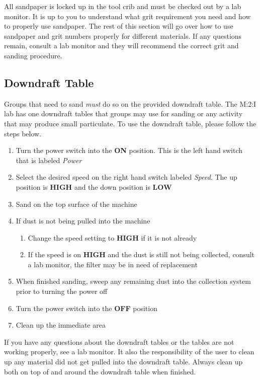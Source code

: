 All sandpaper is locked up in the tool crib and must be checked out by a lab monitor. It is up to you to understand what grit requirement you need and how to properly use sandpaper. The rest of this section will go over how to use sandpaper and grit numbers properly for different materials. If any questions remain, consult a lab monitor and they will recommend the correct grit and sanding procedure.

\subsection{Downdraft Table}
Groups that need to sand \emph{must} do so on the provided downdraft table. The M:2:I lab has one downdraft tables that groups may use for sanding or any activity that may produce small particulate.  To use the downdraft table, please follow the steps below.

\begin{enumerate}
\item Turn the power switch into the \textbf{ON} position. This is the left hand switch that is labeled \textit{Power}
\item Select the desired speed on the right hand switch labeled \textit{Speed}. The up position is \textbf{HIGH} and the down position is \textbf{LOW}
\item Sand on the top surface of the machine
\item If dust is not being pulled into the machine
\begin{enumerate}
\item Change the speed setting to \textbf{HIGH} if it is not already
\item If the speed is on \textbf{HIGH} and the dust is still not being collected, consult a lab monitor, the filter may be in need of replacement
\end{enumerate}
\item When finished sanding, sweep any remaining dust into the collection system prior to turning the power off
\item Turn the power switch into the \textbf{OFF} position
\item Clean up the immediate area
\end{enumerate}

If you have any questions about the downdraft tables or the tables are not working properly, see a lab monitor.  It also the responsibility of the user to clean up any material did not get pulled into the downdraft table.  Always clean up both on top of and around the downdraft table when finished.

